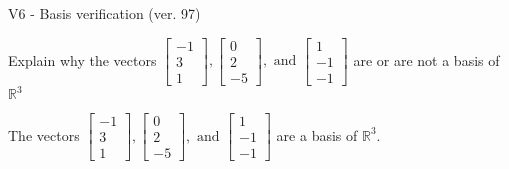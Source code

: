\begin{exercise}
  \begin{exerciseTitle}V6 - Basis verification (ver. 97)\end{exerciseTitle}
  \begin{exerciseStatement}
    Explain why the vectors \(\left[\begin{array}{r}
-1 \\
3 \\
1
\end{array}\right] , \left[\begin{array}{r}
0 \\
2 \\
-5
\end{array}\right] , \text{ and } \left[\begin{array}{r}
1 \\
-1 \\
-1
\end{array}\right]\) are or are not a basis of \(\mathbb{R}^3\)	


  \end{exerciseStatement}
  \begin{exerciseAnswer}
   The vectors \(\left[\begin{array}{r}
-1 \\
3 \\
1
\end{array}\right] , \left[\begin{array}{r}
0 \\
2 \\
-5
\end{array}\right] , \text{ and } \left[\begin{array}{r}
1 \\
-1 \\
-1
\end{array}\right]\) 
  	 are  a basis of \(\mathbb{R}^3\).
  


  \end{exerciseAnswer}
\end{exercise}